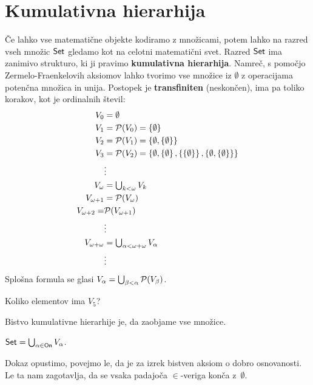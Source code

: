 \section{Kumulativna hierarhija}

Če lahko vse matematične objekte kodiramo z množicami, potem lahko na razred
vseh množic $\mathsf{Set}$ gledamo kot na celotni matematični svet. Razred $\mathsf{Set}$ ima
zanimivo strukturo, ki ji pravimo \textbf{kumulativna hierarhija}. Namreč, s pomočjo
Zermelo-Fraenkelovih aksiomov lahko tvorimo vse množice iz $\emptyset$ z
operacijama potenčna množica in unija. Postopek je \textbf{transfiniten} (neskončen), ima pa toliko korakov, kot je ordinalnih števil:
%
\begin{align*}
  V_0 &= \emptyset \\
  V_1 &= \mathcal{P}(V_0) = \left\{\emptyset\right\} \\
  V_2 &= \mathcal{P}(V_1) = \left\{\emptyset, \left\{\emptyset\right\}\right\} \\
  V_3 &= \mathcal{P}(V_2) = \left\{\emptyset, \left\{\emptyset\right\}, \left\{\left\{\emptyset\right\}\right\}, \left\{\emptyset, \left\{\emptyset\right\}\right\}\right\} \\
      &\vdots \\
  V_\omega &= \textstyle\bigcup_{k < \omega} V_k \\
  V_{\omega+1} &= \mathcal{P}(V_\omega) \\
  V_{\omega+2} = &\mathcal{P}(V_{\omega+1}) \\
  &\vdots \\
  V_{\omega + \omega} &= \textstyle\bigcup_{\alpha < \omega + \omega} V_\alpha \\
  &\vdots
\end{align*}
%
Splošna formula se glasi $V_\alpha = \textstyle\bigcup_{\beta < \alpha} \mathcal{P}(V_\beta)$.


\begin{naloga}
  Koliko elementov ima $V_5$?
\end{naloga}

Bistvo kumulativne hierarhije je, da zaobjame vse množice.

\begin{izrek}
  $\mathsf{Set} = \bigcup_{\alpha \in \mathsf{On}} V_\alpha$.
\end{izrek}

\begin{dokaz}
  Dokaz opustimo, povejmo le, da je za izrek bistven aksiom o dobro osnovanosti. Le ta nam zagotavlja, da se vsaka padajoča $\in$-veriga konča z~$\emptyset$.
\end{dokaz}


